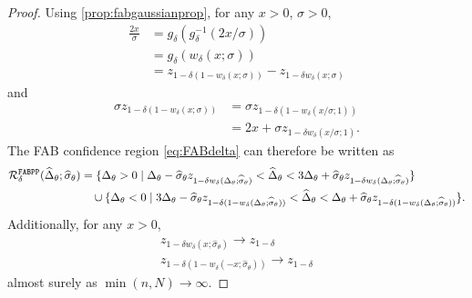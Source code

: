 \begin{proof}
    Using \cref{prop:fabgaussianprop}, for any $x>0$, $\sigma>0$,
    \begin{align*}
        \frac{2x}{\sigma}&=g_\delta(g^{-1}_\delta(2x/\sigma))\\
        &=g_\delta(w_\delta(x;\sigma))\\
        &=z_{1-\delta(1-w_\delta(x;\sigma))}-z_{1-\delta w_\delta(x;\sigma)}
    \end{align*}
    and
    \begin{align*}
        \sigma z_{1-\delta(1-w_\delta(x; \sigma))}&=\sigma z_{1-\delta(1-w_\delta(x/\sigma; 1))}\\
        &= 2x + \sigma z_{1-\delta w_\delta(x/\sigma;1)}.
    \end{align*}
    The FAB confidence region \eqref{eq:FABdelta} can therefore be written as
    \begin{align*}
        \mathcal R^{\mathrm{\texttt{FABPP}}}_\delta(\widehat{\Delta}_\theta; \widehat{\sigma}_\theta )&=\{\Delta_\theta>0  \mid \Delta_\theta -\widehat{\sigma}_\theta z_{1-\delta w_\delta(\Delta_\theta; \widehat{\sigma}_\theta)}<\widehat\Delta_\theta< 3\Delta_\theta + \widehat{\sigma}_\theta z_{1-\delta w_\delta(\Delta_\theta; \widehat{\sigma}_\theta)}\}\\
        &~~~\cup
        \{\Delta_\theta<0  \mid 3\Delta_\theta -\widehat{\sigma}_\theta z_{1-\delta (1-w_\delta(\Delta_\theta; \widehat{\sigma}_\theta))}<\widehat\Delta_\theta<\Delta_\theta + \widehat{\sigma}_\theta z_{1-\delta(1-w_\delta(\Delta_\theta; \widehat{\sigma}_\theta))}\}.
    \end{align*}
    Additionally, for any $x>0$,
    \begin{align*}
        z_{1-\delta w_\delta(x; \widehat{\sigma}_\theta)}\to z_{1-\delta}\\
        z_{1-\delta (1-w_\delta(-x; \widehat{\sigma}_\theta))}\to z_{1-\delta}
    \end{align*}
    almost surely as $\min(n,N)\to\infty$.


\end{proof}
